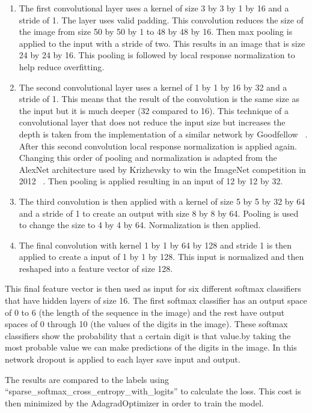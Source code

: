 \documentclass[12pt,twocolumn,letterpaper]{article}
\begin{document}
\begin{enumerate}
	\item The first convolutional layer uses a kernel of size 3 by 3 by 1 by 16 
	and a stride of 1. The layer uses valid padding. This convolution reduces the 
	size of the image from size 50 by 50 by 1 to 48 by 48 by 16. Then max pooling is 
	applied to the input with a stride of two. This results in an image that is 
	size 24 by 24 by 16. This pooling is followed by local response normalization 
	to help reduce overfitting.
	\item The second convolutional layer uses a kernel of 1 by 1 by 16 by 32 and 
	a stride of 1. This means that the result of the convolution is the same size 
	as the input but it is much deeper (32 compared to 16). This technique of a 
	convolutional layer that does not reduce the input size but increases the 
	depth is taken from the implementation of a similar network by Goodfellow 
	\etal ~\cite{goodfellow}. After this second convolution local response 
	normalization is applied again. Changing this order of pooling and 
	normalization is adapted from the AlexNet architecture used by Krizhevsky 
	\etal to win the ImageNet competition in 2012 ~\cite{alex}. Then pooling is 
	applied resulting in an input of 12 by 12 by 32.
	\item The third convolution is then applied with a kernel of size 5 by 5 by 
	32 by 64 and a stride of 1 to create an output with size 8 by 8 by 64. 
	Pooling is used to change the size to 4 by 4 by 64. Normalization is then 
	applied.
	\item The final convolution with kernel 1 by 1 by 64 by 128 and stride 1 is 
	then applied to create a input of 1 by 1 by 128. This input is normalized 
	and then reshaped into a feature vector of size 128.
\end{enumerate}
 
This final feature vector is then used as input for six different softmax classifiers that 
have hidden layers of size 16. The first softmax classifier has an output space 
of 0 to 6 (the length of the sequence in the image) and the rest have output 
spaces of 0 through 10 (the values of the digits in the image). These softmax 
classifiers show the probability that a certain digit is that value.by taking 
the most probable value we can make predictions of the digits in the image. In 
this network dropout is applied to each layer save input and output. 

The results are compared to the labels using 
``sparse\_softmax\_cross\_entropy\_with\_logits'' to calculate the loss. This 
cost is then minimized by the AdagradOptimizer in order to train the model.
\end{document}
